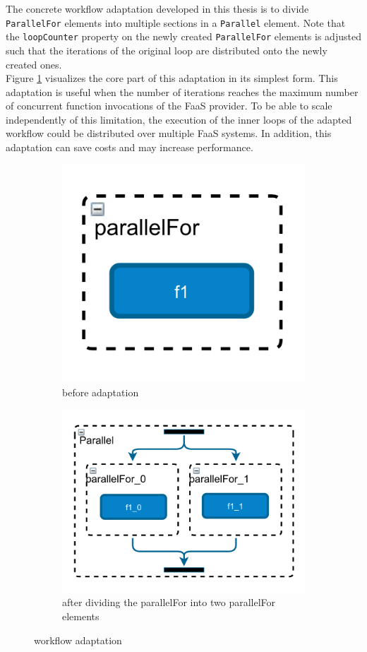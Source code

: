 \documentclass[a4paper,top=25mm,bottom=25mm,12pt,pdftex,halfparskip,twoside,bibtotoc,numbers=noenddot]{scrbook}
\begin{document}
The concrete workflow adaptation developed in this thesis is to divide \texttt{ParallelFor} elements into multiple sections in a \texttt{Parallel} element.
Note that the \texttt{loopCounter} property on the newly created \texttt{ParallelFor} elements is adjusted such that the iterations of the original loop are distributed onto the newly created ones.\\
Figure \ref{fig:workflow-adaptation} visualizes the core part of this adaptation in its simplest form.
This adaptation is useful when the number of iterations reaches the maximum number of concurrent function invocations of the FaaS provider. To be able to scale independently of this limitation, the execution of the inner loops of the adapted workflow could be distributed over multiple FaaS systems. In addition, this adaptation can save costs and may increase performance.

\begin{figure}[H]
\centering
\begin{subfigure}{.28\textwidth}
  \centering
  \includegraphics[width=.8\linewidth]{adaptation-before}
  \caption{before adaptation}
\end{subfigure}
\begin{subfigure}{.54\textwidth}
  \centering
  \includegraphics[width=.8\linewidth]{adaptation-after}
  \caption{after dividing the parallelFor into two parallelFor elements}
\end{subfigure}
\caption{workflow adaptation}
\label{fig:workflow-adaptation}
\end{figure}
\end{document}
